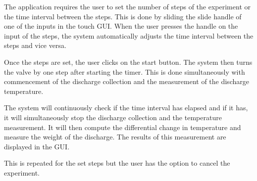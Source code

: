 The application requires the user to set the number of steps of the experiment or the time interval between the steps. This is done by sliding the slide handle of one of the inputs in the touch GUI. When the user presses the handle on the input of the steps, the system automatically adjusts the time interval between the steps and vice versa.
\par
Once the steps are set, the user clicks on the start button. The system then turns the valve by one step after starting the timer. This is done simultaneously with commencement of the discharge collection and the measurement of the discharge temperature.
\par
The system will continuously check if the time interval has elapsed and if it has, it will simultaneously stop the discharge collection and the temperature measurement.  It will then compute the differential change in temperature and measure the weight of the discharge. The results of this measurement are displayed in the GUI. \par
This is repeated for the set steps but the user has the option to cancel the experiment.

